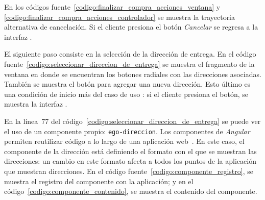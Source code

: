 

En los códigos fuente~\ref{codigo:finalizar_compra_acciones_ventana} y
\ref{codigo:finalizar_compra_acciones_controlador} se muestra la trayectoria
alternativa de cancelación. Si el cliente presiona el botón \textit{Cancelar}
se regresa a la interfaz .

El siguiente paso consiste en la selección de la dirección de entrega. En el
código fuente~\ref{codigo:seleccionar_direccion_de_entrega} se muestra el
fragmento de la ventana en donde se encuentran los botones radiales con las
direcciones asociadas. También se muestra el botón para agregar una nueva
dirección. Esto último es una condición de inicio más del caso de uso
: si el cliente presiona el
botón, se muestra la interfaz
.


En la línea~77 del código~\ref{codigo:seleccionar_direccion_de_entrega} se
puede ver el uso de un componente propio: \texttt{ego-direccion}. Los
componentes de \textit{Angular} permiten reutilizar código a lo largo de una
aplicación web~\cite{angular_componentes}. En este caso, el componente de la
dirección está definiendo el formato con el que se muestran las direcciones: un
cambio en este formato afecta a todos los puntos de la aplicación que muestran
direcciones. En el código fuente~\ref{codigo:componente_registro}, se muestra 
el registro del componente con la aplicación; y en el
código~\ref{codigo:componente_contenido}, se muestra el contenido del componente.



